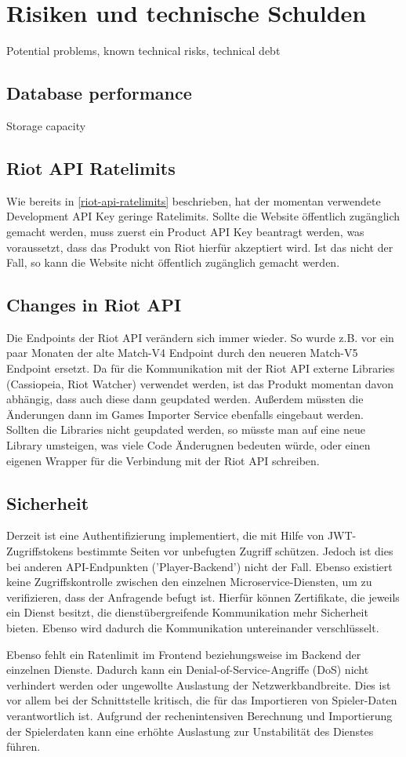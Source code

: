 \section{Risiken und technische Schulden}
Potential problems, known technical risks, technical debt

\subsection{Database performance}
Storage capacity

\subsection{Riot API Ratelimits}
Wie bereits in \ref{riot-api-ratelimits} beschrieben, hat der momentan verwendete Development API Key geringe Ratelimits. Sollte die Website öffentlich zugänglich gemacht werden, muss zuerst ein Product API Key beantragt werden, was voraussetzt, dass das Produkt von Riot hierfür akzeptiert wird. Ist das nicht der Fall, so kann die Website nicht öffentlich zugänglich gemacht werden.

\subsection{Changes in Riot API}
Die Endpoints der Riot API verändern sich immer wieder. So wurde z.B. vor ein paar Monaten der alte Match-V4 Endpoint durch den neueren Match-V5 Endpoint ersetzt. Da für die Kommunikation mit der Riot API externe Libraries (Cassiopeia, Riot Watcher) verwendet werden, ist das Produkt momentan davon abhängig, dass auch diese dann geupdated werden.
Außerdem müssten die Änderungen dann im Games Importer Service ebenfalls eingebaut werden.\\ Sollten die Libraries nicht geupdated werden, so müsste man auf eine neue Library umsteigen, was viele Code Änderugnen bedeuten würde, oder einen eigenen Wrapper für die Verbindung mit der Riot API schreiben.

\subsection{Sicherheit}

Derzeit ist eine Authentifizierung implementiert, die mit Hilfe von JWT-Zugriffstokens bestimmte Seiten vor unbefugten Zugriff schützen.
Jedoch ist dies bei anderen API-Endpunkten ('Player-Backend') nicht der Fall. Ebenso existiert keine Zugriffskontrolle zwischen den
einzelnen Microservice-Diensten, um zu verifizieren, dass der Anfragende befugt ist. Hierfür können Zertifikate, die jeweils ein
Dienst besitzt, die dienstübergreifende Kommunikation mehr Sicherheit bieten. Ebenso wird dadurch die Kommunikation untereinander
verschlüsselt.

Ebenso fehlt ein Ratenlimit im Frontend beziehungsweise im Backend der einzelnen Dienste. Dadurch kann ein Denial-of-Service-Angriffe (DoS)
nicht verhindert werden oder ungewollte Auslastung der Netzwerkbandbreite. Dies ist vor allem bei der Schnittstelle kritisch, die für das 
Importieren von Spieler-Daten verantwortlich ist. Aufgrund der rechenintensiven Berechnung und Importierung der Spielerdaten kann 
eine erhöhte Auslastung zur Unstabilität des Dienstes führen.